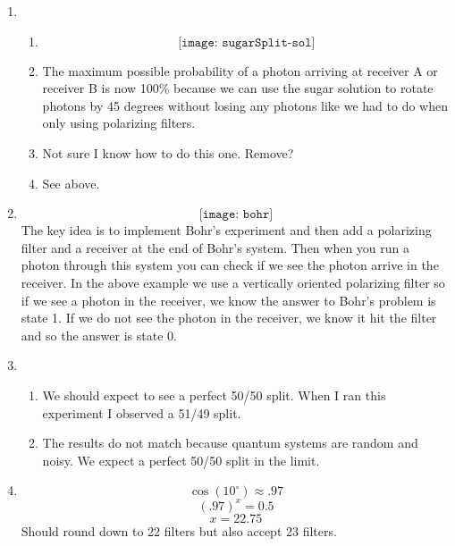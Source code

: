 \documentclass[12pt]{article}
\begin{document}
\begin{enumerate}[font=\bfseries]
    \item \begin{enumerate}
        \item \[\texttt{[image: sugarSplit-sol]}\]
        \item The maximum possible probability of a photon arriving at receiver A or receiver B is now 100\% because we can use the sugar solution to rotate photons by 45 degrees without losing any photons like we had to do when only using polarizing filters.
        \item Not sure I know how to do this one. Remove?
        \item See above.
    \end{enumerate}
    \item 
    \[\texttt{[image: bohr]}\]
    The key idea is to implement Bohr’s experiment and then add a polarizing filter and a receiver at the end of Bohr’s system. Then when you run a photon through this system you can check if we see the photon arrive in the receiver. In the above example we use a vertically oriented polarizing filter so if we see a photon in the receiver, we know the answer to Bohr’s problem is state 1. If we do not see the photon in the receiver, we know it hit the filter and so the answer is state 0.
    \item \begin{enumerate}
        \item We should expect to see a perfect 50/50 split. When I ran this experiment I observed a 51/49 split.
        \item The results do not match because quantum systems are random and noisy. We expect a perfect 50/50 split in the limit.
    \end{enumerate}
    \item \[\cos({10^{\circ}}) \approx .97 \]
            \[(.97)^x = 0.5\]
            \[x = 22.75\]
            Should round down to 22 filters but also accept 23 filters.
\end{enumerate}
\end{document}
